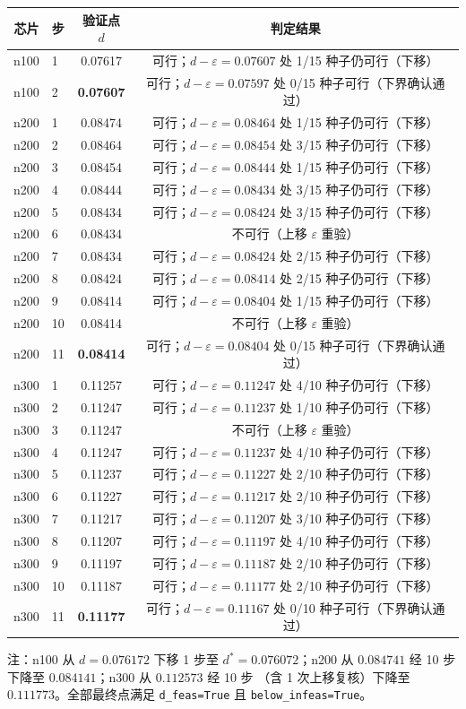 \documentclass[12pt,a4paper]{article}
\begin{document}
\begin{table}[H]
\centering
\scriptsize
\setlength{\tabcolsep}{3pt}
\begin{tabular}{clcc}
\toprule
芯片 & 步 & 验证点 $d$ & 判定结果 \\
\midrule

n100 & 1 & 0.07617 & 可行；$d-\varepsilon=0.07607$ 处 1/15 种子仍可行（下移） \\
n100 & 2 & \textbf{0.07607} & 可行；$d-\varepsilon=0.07597$ 处 0/15 种子可行（下界确认通过） \\
n200 & 1 & 0.08474 & 可行；$d-\varepsilon=0.08464$ 处 1/15 种子仍可行（下移） \\
n200 & 2 & 0.08464 & 可行；$d-\varepsilon=0.08454$ 处 3/15 种子仍可行（下移） \\
n200 & 3 & 0.08454 & 可行；$d-\varepsilon=0.08444$ 处 1/15 种子仍可行（下移） \\
n200 & 4 & 0.08444 & 可行；$d-\varepsilon=0.08434$ 处 3/15 种子仍可行（下移） \\
n200 & 5 & 0.08434 & 可行；$d-\varepsilon=0.08424$ 处 3/15 种子仍可行（下移） \\
n200 & 6 & 0.08434 & 不可行（上移 $\varepsilon$ 重验） \\
n200 & 7 & 0.08434 & 可行；$d-\varepsilon=0.08424$ 处 2/15 种子仍可行（下移） \\
n200 & 8 & 0.08424 & 可行；$d-\varepsilon=0.08414$ 处 2/15 种子仍可行（下移） \\
n200 & 9 & 0.08414 & 可行；$d-\varepsilon=0.08404$ 处 1/15 种子仍可行（下移） \\
n200 & 10 & 0.08414 & 不可行（上移 $\varepsilon$ 重验） \\
n200 & 11 & \textbf{0.08414} & 可行；$d-\varepsilon=0.08404$ 处 0/15 种子可行（下界确认通过） \\
n300 & 1 & 0.11257 & 可行；$d-\varepsilon=0.11247$ 处 4/10 种子仍可行（下移） \\
n300 & 2 & 0.11247 & 可行；$d-\varepsilon=0.11237$ 处 1/10 种子仍可行（下移） \\
n300 & 3 & 0.11247 & 不可行（上移 $\varepsilon$ 重验） \\
n300 & 4 & 0.11247 & 可行；$d-\varepsilon=0.11237$ 处 4/10 种子仍可行（下移） \\
n300 & 5 & 0.11237 & 可行；$d-\varepsilon=0.11227$ 处 2/10 种子仍可行（下移） \\
n300 & 6 & 0.11227 & 可行；$d-\varepsilon=0.11217$ 处 2/10 种子仍可行（下移） \\
n300 & 7 & 0.11217 & 可行；$d-\varepsilon=0.11207$ 处 3/10 种子仍可行（下移） \\
n300 & 8 & 0.11207 & 可行；$d-\varepsilon=0.11197$ 处 4/10 种子仍可行（下移） \\
n300 & 9 & 0.11197 & 可行；$d-\varepsilon=0.11187$ 处 2/10 种子仍可行（下移） \\
n300 & 10 & 0.11187 & 可行；$d-\varepsilon=0.11177$ 处 2/10 种子仍可行（下移） \\
n300 & 11 & \textbf{0.11177} & 可行；$d-\varepsilon=0.11167$ 处 0/10 种子可行（下界确认通过） \\
\bottomrule
\end{tabular}
\end{table}

注：n100 从 $d=0.076172$ 下移 1 步至 $d^*=0.076072$；n200 从
$0.084741$ 经 10 步下降至 $0.084141$；n300 从 $0.112573$ 经 10 步
（含 1 次上移复核）下降至 $0.111773$。全部最终点满足
\texttt{d\_feas=True} 且 \texttt{below\_infeas=True}。
\end{document}

